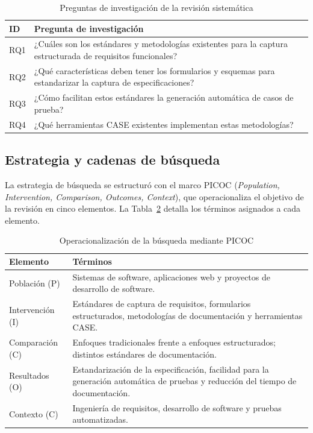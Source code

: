 \documentclass[10pt,journal,twoside,letterpaper]{IEEEtran}
\begin{document}
    \begin{table}[!tb]
        \caption{Preguntas de investigación de la revisión sistemática}
        \label{tab:rqs}
        \centering
        \small
        \begin{tabular}{@{}p{}p{}@{}}
            \toprule
            \textbf{ID} & \textbf{Pregunta de investigación} \\
            \midrule
            RQ1 & ¿Cuáles son los estándares y metodologías existentes para la captura estructurada de requisitos funcionales? \\
            RQ2 & ¿Qué características deben tener los formularios y esquemas para estandarizar la captura de especificaciones? \\
            RQ3 & ¿Cómo facilitan estos estándares la generación automática de casos de prueba? \\
            RQ4 & ¿Qué herramientas CASE existentes implementan estas metodologías? \\
            \bottomrule
        \end{tabular}
    \end{table}
    
    \subsection{Estrategia y cadenas de búsqueda}
    \label{subsec:busqueda}
    
    La estrategia de búsqueda se estructuró con el marco PICOC (\emph{Population, Intervention, Comparison, Outcomes, Context}), que operacionaliza el objetivo de la revisión en cinco elementos. La Tabla~\ref{tab:picoc} detalla los términos asignados a cada elemento.
    
    \begin{table}[!tb]
        \caption{Operacionalización de la búsqueda mediante PICOC}
        \label{tab:picoc}
        \centering
        \small
        \begin{tabular}{@{}p{}p{}@{}}
            \toprule
            \textbf{Elemento} & \textbf{Términos} \\
            \midrule
            Población (P)   & Sistemas de software, aplicaciones web y proyectos de desarrollo de software. \\
            Intervención (I)& Estándares de captura de requisitos, formularios estructurados, metodologías de documentación y herramientas CASE. \\
            Comparación (C) & Enfoques tradicionales frente a enfoques estructurados; distintos estándares de documentación. \\
            Resultados (O)  & Estandarización de la especificación, facilidad para la generación automática de pruebas y reducción del tiempo de documentación. \\
            Contexto (C)    & Ingeniería de requisitos, desarrollo de software y pruebas automatizadas. \\
            \bottomrule
        \end{tabular}
    \end{table}
    
\end{document}
